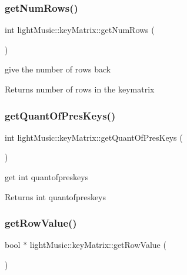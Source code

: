 \subsubsection{\texorpdfstring{get\+Num\+Rows()}{getNumRows()}}
{\footnotesize\ttfamily int light\+Music\+::key\+Matrix\+::get\+Num\+Rows (\begin{DoxyParamCaption}{ }\end{DoxyParamCaption})}



give the number of rows back 

\begin{DoxyReturn}{Returns}
number of rows in the keymatrix 
\end{DoxyReturn}
\mbox{\label{classlight_music_1_1key_matrix_a3508804c32287b9694bf2329aa4f9ece}} 
\subsubsection{\texorpdfstring{get\+Quant\+Of\+Pres\+Keys()}{getQuantOfPresKeys()}}
{\footnotesize\ttfamily int light\+Music\+::key\+Matrix\+::get\+Quant\+Of\+Pres\+Keys (\begin{DoxyParamCaption}{ }\end{DoxyParamCaption})}



get int quantofpreskeys 

\begin{DoxyReturn}{Returns}
int quantofpreskeys 
\end{DoxyReturn}
\mbox{\label{classlight_music_1_1key_matrix_a11147e2bed1cc44d6127d23f6d1750be}} 
\subsubsection{\texorpdfstring{get\+Row\+Value()}{getRowValue()}}
{\footnotesize\ttfamily bool $\ast$ light\+Music\+::key\+Matrix\+::get\+Row\+Value (\begin{DoxyParamCaption}{ }\end{DoxyParamCaption})}



